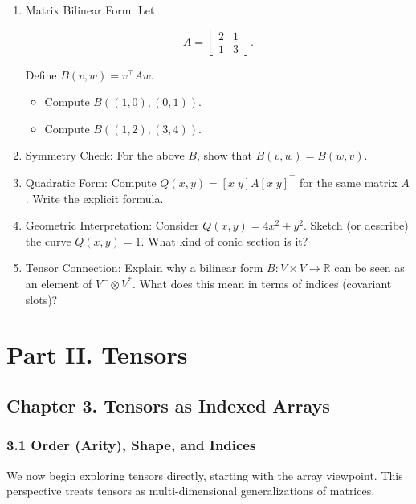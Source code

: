 \documentclass[
  letterpaper,
  DIV=11,
  numbers=noendperiod]{scrreprt}
\providecommand{\tightlist}{%
  \setlength{\itemsep}{0pt}\setlength{\parskip}{0pt}}
\begin{document}
\begin{enumerate}
\def\labelenumi{\arabic{enumi}.}
\item
  Matrix Bilinear Form: Let

  \[
  A = \begin{bmatrix}2 & 1 \\ 1 & 3\end{bmatrix}.
  \]

  Define \(B(v,w) = v^\top A w\).

  \begin{itemize}
  \tightlist
  \item
    Compute \(B((1,0),(0,1))\).
  \item
    Compute \(B((1,2),(3,4))\).
  \end{itemize}
\item
  Symmetry Check: For the above \(B\), show that \(B(v,w) = B(w,v)\).
\item
  Quadratic Form: Compute \(Q(x,y) = [x \; y] A [x \; y]^\top\) for the
  same matrix \(A\). Write the explicit formula.
\item
  Geometric Interpretation: Consider \(Q(x,y) = 4x^2 + y^2\). Sketch (or
  describe) the curve \(Q(x,y)=1\). What kind of conic section is it?
\item
  Tensor Connection: Explain why a bilinear form
  \(B: V \times V \to \mathbb{R}\) can be seen as an element of
  \(V^- \otimes V^*\). What does this mean in terms of indices
  (covariant slots)?
\end{enumerate}


\chapter{Part II. Tensors}\label{part-ii.-tensors}

\section{Chapter 3. Tensors as Indexed
Arrays}\label{chapter-3.-tensors-as-indexed-arrays}

\subsection{3.1 Order (Arity), Shape, and
Indices}\label{order-arity-shape-and-indices}

We now begin exploring tensors directly, starting with the array
viewpoint. This perspective treats tensors as multi-dimensional
generalizations of matrices.
\end{document}
